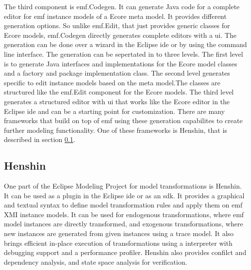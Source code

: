     The third component is \ac{emf}.Codegen. It can generate Java code for a complete editor for \ac{emf} instance models of a Ecore meta model. It provides different generation options. So unlike \ac{emf}.Edit, that just provides generic classes for Ecore models, \ac{emf}.Codegen directly generates complete editors with a \acs{ui}. \cite{eclipse_emf} The generation can be done over a wizard in the Eclipse \ac{ide} or by using the command line interface. \cite{emf} The generation can be sepertated in to three levels. The first level is to generate Java interfaces and implementations for the Ecore model classes and a factory and package implementation class. The second level generates specific  to edit instance models based on the meta model.The classes are structured like the \ac{emf}.Edit component for the Ecore models. The third level generates a structured editor with \acs{ui} that works like the Ecore editor in the Eclipse \ac{ide} and can be a starting point for customization. \cite{eclipse_emf} There are many frameworks that build on top of \ac{emf} using these generation capabilites to create further modeling functionality. One of these frameworks is Henshin, that is described in section \ref{subsec:henshin}.

  \subsection{Henshin}
  \label{subsec:henshin}

  One part of the Eclipse Modeling Project for model transformations is Henshin. It can be used as a plugin in the Eclipse \ac{ide} or as an \acs{sdk}. It provides a graphical and textual syntax to define model transformation rules and apply them on \ac{emf} XMI instance models. It can be used for endogenous transformations, where \ac{emf} model instances are directly transformed, and exogenous transformations, where new instances are generated from given instances using a trace model. It also brings efficient in-place execution of transformations using a interpreter with debugging support and a performance profiler. Henshin also provides confilct and dependency analysis, and state space analysis for verification. \cite{henshin-repo}

